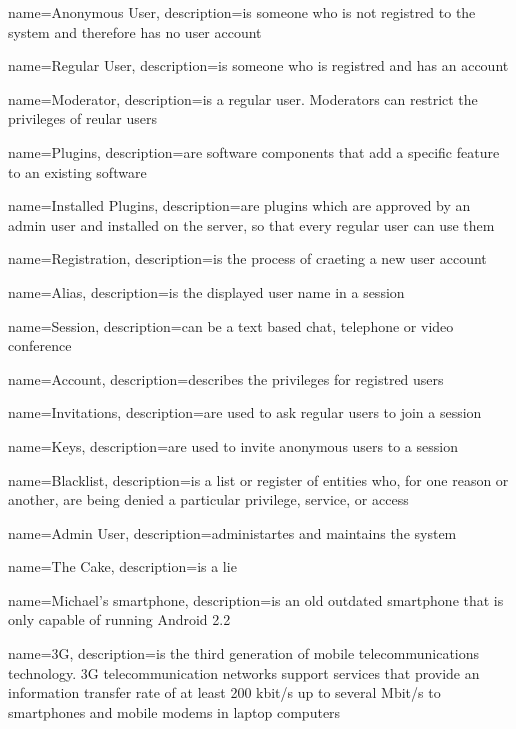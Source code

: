 {
  name=Anonymous User,
  description={is someone who is not registred to the system and therefore has no user account}
}

{
  name=Regular User,
  description={is someone who is registred and has an account}
}

{
  name=Moderator,
  description={is a regular user. Moderators can restrict the privileges of reular users}
}

{
  name=Plugins,
  description={are software components that add a specific feature to an existing software}
}

{
  name=Installed Plugins,
  description={are plugins which are approved by an admin user and installed on the server, so that every regular user can use them}
}

{
  name=Registration,
  description={is the process of craeting a new user account}
}

{
  name=Alias,
  description={is the displayed user name in a session}
}

{
  name=Session,
  description={can be a text based chat, telephone or video conference}
}

{
  name=Account,
  description={describes the privileges for registred users}
}

{
  name=Invitations,
  description={are used to ask regular users to join a session}
}

{
  name=Keys,
  description={are used to invite anonymous users to a session}
}

{
  name=Blacklist,
  description={is a list or register of entities who, for one reason or another, are being denied a particular privilege, service, or access}
}

{
  name=Admin User,
  description={administartes and maintains the system}
}

{
  name=The Cake,
  description={is a lie}
}

{
  name=Michael's smartphone,
  description={is an old outdated smartphone that is only capable of running Android 2.2}
}

{
  name=3G,
  description={is the third generation of mobile telecommunications technology. 3G telecommunication networks support services that provide an information transfer rate of at least 200 kbit/s up to several Mbit/s to smartphones and mobile modems in laptop computers}
}
